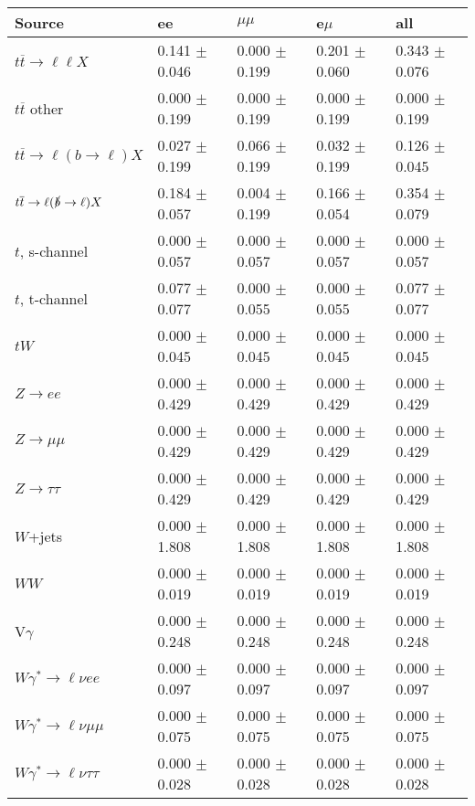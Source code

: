 \begin{tabular}{l | l l l l}
\hline\hline
 Source  &  ee  &  $\mu\mu$  &  e$\mu$  &  all \\
\hline
$t\overline{t}\rightarrow \ell\ell X$ &  0.141 $\pm$  0.046 &  0.000 $\pm$  0.199 &  0.201 $\pm$  0.060 &  0.343 $\pm$  0.076\\
$t\overline{t}$ other &  0.000 $\pm$  0.199 &  0.000 $\pm$  0.199 &  0.000 $\pm$  0.199 &  0.000 $\pm$  0.199\\
$t\overline{t}\rightarrow \ell(b\rightarrow \ell)X$ &  0.027 $\pm$  0.199 &  0.066 $\pm$  0.199 &  0.032 $\pm$  0.199 &  0.126 $\pm$  0.045\\
$t\overline{t}\rightarrow \ell(\slashed{b}\rightarrow \ell)X$ &  0.184 $\pm$  0.057 &  0.004 $\pm$  0.199 &  0.166 $\pm$  0.054 &  0.354 $\pm$  0.079\\
\hline
$t$, s-channel &  0.000 $\pm$  0.057 &  0.000 $\pm$  0.057 &  0.000 $\pm$  0.057 &  0.000 $\pm$  0.057\\
$t$, t-channel &  0.077 $\pm$  0.077 &  0.000 $\pm$  0.055 &  0.000 $\pm$  0.055 &  0.077 $\pm$  0.077\\
$tW$ &  0.000 $\pm$  0.045 &  0.000 $\pm$  0.045 &  0.000 $\pm$  0.045 &  0.000 $\pm$  0.045\\
\hline
$Z\rightarrow ee$ &  0.000 $\pm$  0.429 &  0.000 $\pm$  0.429 &  0.000 $\pm$  0.429 &  0.000 $\pm$  0.429\\
$Z\rightarrow\mu\mu$ &  0.000 $\pm$  0.429 &  0.000 $\pm$  0.429 &  0.000 $\pm$  0.429 &  0.000 $\pm$  0.429\\
$Z\rightarrow\tau\tau$ &  0.000 $\pm$  0.429 &  0.000 $\pm$  0.429 &  0.000 $\pm$  0.429 &  0.000 $\pm$  0.429\\
$W$+jets &  0.000 $\pm$  1.808 &  0.000 $\pm$  1.808 &  0.000 $\pm$  1.808 &  0.000 $\pm$  1.808\\
$WW$ &  0.000 $\pm$  0.019 &  0.000 $\pm$  0.019 &  0.000 $\pm$  0.019 &  0.000 $\pm$  0.019\\
\hline
V$\gamma$ &  0.000 $\pm$  0.248 &  0.000 $\pm$  0.248 &  0.000 $\pm$  0.248 &  0.000 $\pm$  0.248\\
$W\gamma^{*}\rightarrow\ell\nu e e$ &  0.000 $\pm$  0.097 &  0.000 $\pm$  0.097 &  0.000 $\pm$  0.097 &  0.000 $\pm$  0.097\\
$W\gamma^{*}\rightarrow\ell\nu\mu\mu$ &  0.000 $\pm$  0.075 &  0.000 $\pm$  0.075 &  0.000 $\pm$  0.075 &  0.000 $\pm$  0.075\\
$W\gamma^{*}\rightarrow\ell\nu\tau\tau$ &  0.000 $\pm$  0.028 &  0.000 $\pm$  0.028 &  0.000 $\pm$  0.028 &  0.000 $\pm$  0.028\\

\end{tabular}
